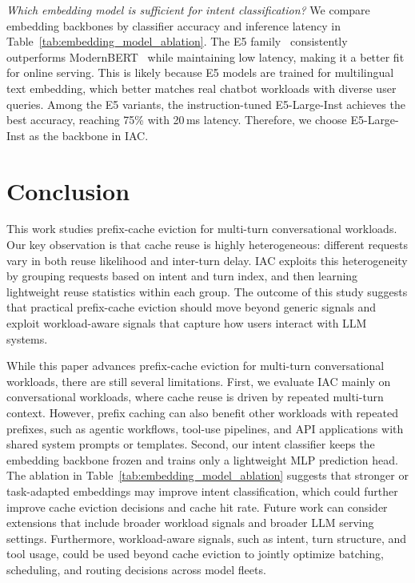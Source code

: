 \documentclass{article}
\begin{document}
\textit{Which embedding model is sufficient for intent classification?} We compare embedding backbones by classifier accuracy and inference latency in Table~\ref{tab:embedding_model_ablation}. The E5 family~\cite{wang2024multilingual} consistently outperforms ModernBERT~\cite{modernbert} while maintaining low latency, making it a better fit for online serving. This is likely because E5 models are trained for multilingual text embedding, which better matches real chatbot workloads with diverse user queries. Among the E5 variants, the instruction-tuned E5-Large-Inst achieves the best accuracy, reaching 75\% with 20\,ms latency. Therefore, we choose E5-Large-Inst as the backbone in IAC.




\vspace{-10pt}

\section{Conclusion}
\label{sec:conclusion}

\vspace{-10pt}

This work studies prefix-cache eviction for multi-turn conversational workloads. Our key observation is that cache reuse is highly heterogeneous: different requests vary in both reuse likelihood and inter-turn delay. IAC exploits this heterogeneity by grouping requests based on intent and turn index, and then learning lightweight reuse statistics within each group. The outcome of this study suggests that practical prefix-cache eviction should move beyond generic signals and exploit workload-aware signals that capture how users interact with LLM systems.

While this paper advances prefix-cache eviction for multi-turn conversational workloads, there are still several limitations. First, we evaluate IAC mainly on conversational workloads, where cache reuse is driven by repeated multi-turn context. However, prefix caching can also benefit other workloads with repeated prefixes, such as agentic workflows, tool-use pipelines, and API applications with shared system prompts or templates. Second, our intent classifier keeps the embedding backbone frozen and trains only a lightweight MLP prediction head. The ablation in Table~\ref{tab:embedding_model_ablation} suggests that stronger or task-adapted embeddings may improve intent classification, which could further improve cache eviction decisions and cache hit rate. Future work can consider extensions that include broader workload signals and broader LLM serving settings. Furthermore, workload-aware signals, such as intent, turn structure, and tool usage, could be used beyond cache eviction to jointly optimize batching, scheduling, and routing decisions across model fleets.
\end{document}
